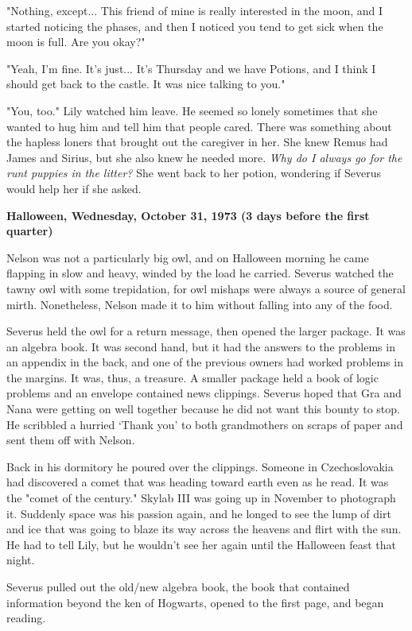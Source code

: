\documentclass[a4paper,11pt]{article}
\begin{document}
"Nothing, except... This friend of mine is really interested in the moon, and I started noticing the phases, and then I noticed you tend to get sick when the moon is full. Are you okay?"

"Yeah, I'm fine. It's just... It's Thursday and we have Potions, and I think I should get back to the castle. It was nice talking to you."

"You, too." Lily watched him leave. He seemed so lonely sometimes that she wanted to hug him and tell him that people cared. There was something about the hapless loners that brought out the caregiver in her. She knew Remus had James and Sirius, but she also knew he needed more. \emph{Why do I always go for the runt puppies in the litter?} She went back to her potion, wondering if Severus would help her if she asked.

\textbf{Halloween, Wednesday, October 31, 1973 (3 days before the first quarter)}

Nelson was not a particularly big owl, and on Halloween morning he came flapping in slow and heavy, winded by the load he carried. Severus watched the tawny owl with some trepidation, for owl mishaps were always a source of general mirth. Nonetheless, Nelson made it to him without falling into any of the food.

Severus held the owl for a return message, then opened the larger package. It was an algebra book. It was second hand, but it had the answers to the problems in an appendix in the back, and one of the previous owners had worked problems in the margins. It was, thus, a treasure. A smaller package held a book of logic problems and an envelope contained news clippings. Severus hoped that Gra and Nana were getting on well together because he did not want this bounty to stop. He scribbled a hurried `Thank you' to both grandmothers on scraps of paper and sent them off with Nelson.

Back in his dormitory he poured over the clippings. Someone in Czechoslovakia had discovered a comet that was heading toward earth even as he read. It was the "comet of the century." Skylab III was going up in November to photograph it. Suddenly space was his passion again, and he longed to see the lump of dirt and ice that was going to blaze its way across the heavens and flirt with the sun. He had to tell Lily, but he wouldn't see her again until the Halloween feast that night.

Severus pulled out the old/new algebra book, the book that contained information beyond the ken of Hogwarts, opened to the first page, and began reading.
\end{document}
